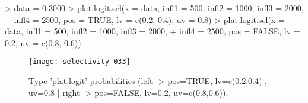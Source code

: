 \documentclass[letterpaper, 12pt]{article}
\begin{document}
\begin{Schunk}
\begin{Sinput}
> data = 0:3000
> plat.logit.sel(x = data, infl1 = 500, infl2 = 1000, infl3 = 2000, 
+     infl4 = 2500, pos = TRUE, lv = c(0.2, 0.4), uv = 0.8)
> plat.logit.sel(x = data, infl1 = 500, infl2 = 1000, infl3 = 2000, 
+     infl4 = 2500, pos = FALSE, lv = 0.2, uv = c(0.8, 0.6))
\end{Sinput}
\end{Schunk}
\begin{figure}[h]
\vspace{-20pt}
\begin{center}
\texttt{[image: selectivity-033]}
\end{center}
\vspace{-30pt}
\caption{Type 'plat.logit' probabilities (left -> pos=TRUE, lv=c(0.2,0.4) , uv=0.8 | right -> pos=FALSE, lv=0.2, uv=c(0.8,0.6)).}
\vspace{-10pt}
\label{fig16}
\end{figure}







        
        
\end{document}
